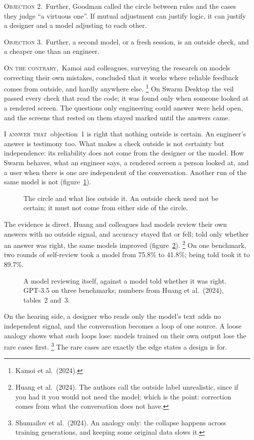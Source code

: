 \documentclass[11pt,a4paper]{article}
\newcounter{art}
\newcommand{\Obj}[1]{\par\vspace{1.5mm}\noindent\textsc{Objection #1.}\ }
\newcommand{\SedContra}{\par\vspace{1.5mm}\noindent\textsc{On the contrary,}\ }
\newcommand{\Respondeo}{\par\vspace{1.5mm}\noindent\textsc{I answer that}\ }
\newcommand{\Fig}[3]{%
  \begin{figure}[tbp]\centering #1 \caption{#2}\label{#3}\end{figure}}
\begin{document}
\Obj{2}Further, Goodman called the circle between rules and the cases they judge ``a virtuous one''. If mutual adjustment can justify logic, it can justify a designer and a model adjusting to each other.

\Obj{3}Further, a second model, or a fresh session, is an outside check, and a cheaper one than an engineer.

\SedContra Kamoi and colleagues, surveying the research on models correcting their own mistakes, concluded that it works where reliable feedback comes from outside, and hardly anywhere else.%
\footnote{Kamoi et al.\ (2024).}
On Swarm Desktop the veil passed every check that read the code; it was found only when someone looked at a rendered screen. The questions only engineering could answer were held open, and the screens that rested on them stayed marked until the answers came.

\Respondeo objection~1 is right that nothing outside is certain. An engineer's answer is testimony too. What makes a check outside is not certainty but independence: its reliability does not come from the designer or the model. How Swarm behaves, what an engineer says, a rendered screen a person looked at, and a user when there is one are independent of the conversation. Another run of the same model is not (figure~\ref{fig:outside}).

\Fig{\FigOutside}{The circle and what lies outside it. An outside check need not be certain; it must not come from either side of the circle.}{fig:outside}

The evidence is direct. Huang and colleagues had models review their own answers with no outside signal, and accuracy stayed flat or fell; told only whether an answer was right, the same models improved (figure~\ref{fig:huang}).%
\footnote{Huang et al.\ (2024). The authors call the outside label unrealistic, since if you had it you would not need the model; which is the point: correction comes from what the conversation does not have.}
On one benchmark, two rounds of self-review took a model from 75.8\% to 41.8\%; being told took it to 89.7\%.

\Fig{\ChartHuang}{A model reviewing itself, against a model told whether it was right. GPT-3.5 on three benchmarks; numbers from Huang et al.\ (2024), tables~2 and~3.}{fig:huang}

On the hearing side, a designer who reads only the model's text adds no independent signal, and the conversation becomes a loop of one source. A loose analogy shows what such loops lose: models trained on their own output lose the rare cases first.%
\footnote{Shumailov et al.\ (2024). An analogy only: the collapse happens across training generations, and keeping some original data slows it.}
The rare cases are exactly the edge states a design is for.
\end{document}
